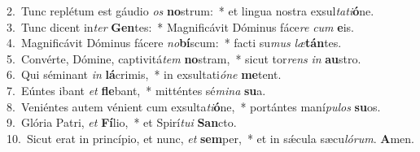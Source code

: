 {2.~}Tunc replétum est gáudio \textit{os} \textbf{no}strum:~* et lingua nostra exsul\textit{ta}\textit{ti}\textbf{ó}ne.\\
{3.~}Tunc dicent in\textit{ter} \textbf{Gen}tes:~* Magnificávit Dóminus fáce\textit{re} \textit{cum} \textbf{e}is.\\
{4.~}Magnificávit Dóminus fácere \textit{no}\textbf{bí}scum:~* facti su\textit{mus} \textit{læ}\textbf{tán}tes.\\
{5.~}Convérte, Dómine, captivitá\textit{tem} \textbf{no}stram,~* sicut tor\textit{rens} \textit{in} \textbf{au}stro.\\
{6.~}Qui séminant \textit{in} \textbf{lá}crimis,~* in exsultati\textit{ó}\textit{ne} \textbf{me}tent.\\
{7.~}Eúntes ibant \textit{et} \textbf{fle}bant,~* mitténtes sé\textit{mi}\textit{na} \textbf{su}a.\\
{8.~}Veniéntes autem vénient cum exsulta\textit{ti}\textbf{ó}ne,~* portántes maní\textit{pu}\textit{los} \textbf{su}os.\\
{9.~}Glória Patri, \textit{et} \textbf{Fí}lio,~* et Spirí\textit{tu}\textit{i} \textbf{San}cto.\\
{10.~}Sicut erat in princípio, et nunc, \textit{et} \textbf{sem}per,~* et in sǽcula sæcu\textit{ló}\textit{rum}. \textbf{A}men.\\

